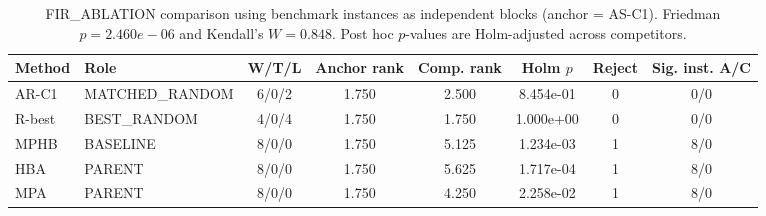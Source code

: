 \begin{table}[!t]
\centering
\footnotesize
\caption{FIR\_ABLATION comparison using benchmark instances as independent blocks (anchor = AS-C1). Friedman $p=2.460e-06$ and Kendall's $W=0.848$. Post hoc $p$-values are Holm-adjusted across competitors.}
\begin{tabular}{llcccccc}
\hline
Method & Role & W/T/L & Anchor rank & Comp. rank & Holm $p$ & Reject & Sig. inst. A/C \\
\hline
AR-C1 & MATCHED\_RANDOM & 6/0/2 & 1.750 & 2.500 & 8.454e-01 & 0 & 0/0 \\
R-best & BEST\_RANDOM & 4/0/4 & 1.750 & 1.750 & 1.000e+00 & 0 & 0/0 \\
MPHB & BASELINE & 8/0/0 & 1.750 & 5.125 & 1.234e-03 & 1 & 8/0 \\
HBA & PARENT & 8/0/0 & 1.750 & 5.625 & 1.717e-04 & 1 & 8/0 \\
MPA & PARENT & 8/0/0 & 1.750 & 4.250 & 2.258e-02 & 1 & 8/0 \\
\hline
\end{tabular}
\end{table}
